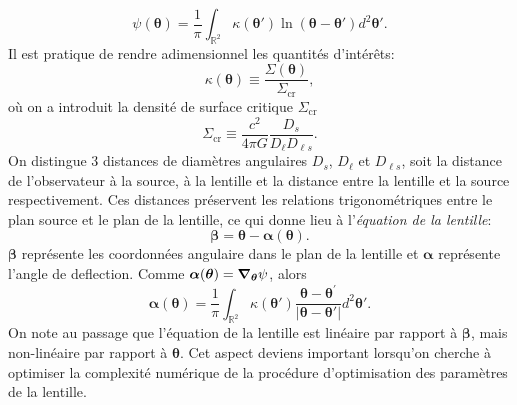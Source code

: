 \documentclass[times,10pt,twocolumn]{article}
\begin{document}
\begin{equation}\label{eq:Potentiel} 
        \psi(\boldsymbol{ \theta}) = \frac{1}{\pi} \int_{\mathbb{R}^2} 
        \kappa(\boldsymbol{ \theta}') \ln(\boldsymbol{\theta} - \boldsymbol{\theta}') d^2\boldsymbol{\theta}'.
\end{equation}
Il est pratique de rendre adimensionnel les quantités d'intérêts:
\begin{equation}\label{eq:Convergence} 
        \kappa(\boldsymbol{\theta}) \equiv \frac{\Sigma(\boldsymbol{\theta})}{\Sigma_{\mathrm{cr}}},
\end{equation} 
où on a introduit la densité de surface critique $\Sigma_{\mathrm{cr}}$
\begin{equation}\label{eq:Sigcritique} 
        \Sigma_{\mathrm{cr}} \equiv \frac{c^2}{4\pi G} \frac{D_s}{D_\ell D_{\ell s}}.
\end{equation}
On distingue 3 distances de diamètres angulaires $D_s$, $D_\ell$ et $D_{\ell s}$, 
soit la distance de l'observateur à la source, à la lentille et la distance 
entre la lentille et la source respectivement. Ces distances préservent les relations 
trigonométriques entre le plan source et le plan de la lentille, ce qui donne 
lieu à l'\textit{équation de la lentille}:
\begin{equation}\label{eq:LensEquation} 
        \boldsymbol{\beta} = \boldsymbol{\theta} - \boldsymbol{\alpha}(\boldsymbol{\theta}).
\end{equation} 
$\boldsymbol{\beta}$ représente les coordonnées angulaire dans le plan de la lentille et 
$\boldsymbol{\alpha}$ représente l'angle de deflection. Comme 
$\boldsymbol{\alpha}(\boldsymbol{\theta}) = \grad_{\boldsymbol{\theta}} \psi$, alors
\begin{equation}\label{eq:DeflectionAngle} 
        \boldsymbol{\alpha}(\boldsymbol{\theta}) = \frac{1}{\pi} \int_{\mathbb{R}^{2}} \kappa(\boldsymbol{\theta}')
        \frac{\boldsymbol{\theta} - \boldsymbol{\theta}^{'}}{|\boldsymbol{\theta} - \boldsymbol{\theta}'|}
        d^{2}\boldsymbol{\theta}'.
\end{equation} 
On note 
au passage que l'équation de la lentille est linéaire par rapport à $\boldsymbol{\beta}$, 
mais non-linéaire par rapport à $\boldsymbol{\theta}$. Cet aspect deviens important lorsqu'on 
cherche à optimiser la complexité numérique de la procédure d'optimisation des paramètres de la 
lentille. \par
\end{document}

